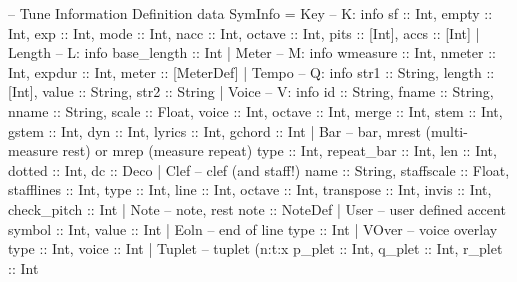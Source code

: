\documentclass[main.tex]{subfiles}
\begin{document}
\begin{code}
--  Tune Information Definition
data SymInfo  = Key {                           -- K: info
                  sf :: Int,                    
                  empty :: Int,                 
                  exp :: Int,                   
                  mode :: Int,                  
                  nacc :: Int,                  
                  octave :: Int,                
                  pits :: [Int],
                  accs :: [Int]
                }
              | Length {                        -- L: info
                  base_length :: Int
                }
              | Meter {                         -- M: info
                  wmeasure :: Int, 
                  nmeter :: Int,  
                  expdur :: Int, 
                  meter :: [MeterDef]
                }
              | Tempo {                         -- Q: info
                  str1 :: String,
                  length :: [Int],
                  value :: String,
                  str2 :: String 
                }
              | Voice {                         -- V: info
                  id :: String, 
                  fname :: String,
                  nname :: String,
                  scale :: Float,
                  voice :: Int, 
                  octave :: Int, 
                  merge :: Int, 
                  stem :: Int, 
                  gstem :: Int,
                  dyn :: Int,  
                  lyrics :: Int,
                  gchord :: Int
                }
              | Bar {   -- bar, mrest (multi-measure rest) or mrep (measure repeat)
                  type :: Int,
                  repeat_bar :: Int,
                  len :: Int,  
                  dotted :: Int,
                  dc :: Deco  
                }
              | Clef {                          -- clef (and staff!)
                  name :: String,               
                  staffscale :: Float,          
                  stafflines :: Int,            
                  type :: Int,                  
                  line :: Int,                  
                  octave :: Int,                
                  transpose :: Int,             
                  invis :: Int,
                  check_pitch :: Int            
                }
              | Note {                          -- note, rest
                  note :: NoteDef
                }
              | User {                          -- user defined accent
                  symbol :: Int,
                  value :: Int
                }
              | Eoln {                          -- end of line
                  type :: Int
                }
              | VOver {                         -- voice overlay
                  type :: Int,
                  voice :: Int
                }
              | Tuplet {                        -- tuplet (n:t:x
                  p_plet :: Int,
                  q_plet :: Int,
                  r_plet :: Int 
                }




\end{code}
\end{document}
